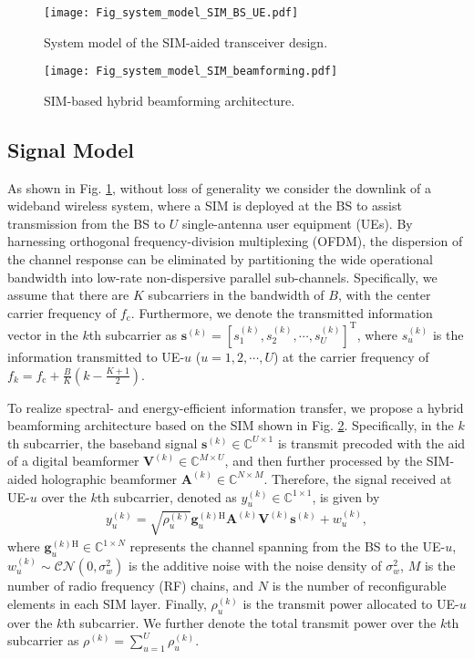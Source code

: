 \documentclass[lettersize,journal]{IEEEtran}
\theoremstyle{remark}
\begin{document}
\begin{figure}[!t]
    \centering
    \texttt{[image: Fig\_system\_model\_SIM\_BS\_UE.pdf]}
    \caption{System model of the SIM-aided transceiver design.}\label{Fig_system_model_SIM_BS_UE}
\end{figure}

\begin{figure}[!t]
    \centering
    \texttt{[image: Fig\_system\_model\_SIM\_beamforming.pdf]}
    \caption{SIM-based hybrid beamforming architecture.}\label{Fig_system_model_SIM_beamforming}
\end{figure}

\subsection{Signal Model}
As shown in Fig. \ref{Fig_system_model_SIM_BS_UE}, without loss of generality we consider the downlink of a wideband wireless system, where a SIM is deployed at the BS to assist transmission from the BS to $U$ single-antenna user equipment (UEs). By harnessing orthogonal frequency-division multiplexing (OFDM), the dispersion of the channel response can be eliminated by partitioning the wide operational bandwidth into low-rate non-dispersive parallel sub-channels. Specifically, we assume that there are $K$ subcarriers in the bandwidth of $B$, with the center carrier frequency of $f_\mathrm{c}$. Furthermore, we denote the transmitted information vector in the $k$th subcarrier as $\mathbf{s}^{(k)}=[s_1^{(k)},s_2^{(k)},\cdots,s_U^{(k)}]^\mathrm{T}$, where $s_u^{(k)}$ is the information transmitted to UE-$u$ ($u=1,2,\cdots,U$) at the carrier frequency of $f_k=f_\mathrm{c}+\frac{B}{K}(k-\frac{K+1}{2})$.

To realize spectral- and energy-efficient information transfer, we propose a hybrid beamforming architecture based on the SIM shown in Fig. \ref{Fig_system_model_SIM_beamforming}. Specifically, in the $k$th subcarrier, the baseband signal $\mathbf{s}^{(k)}\in\mathbb{C}^{U\times1}$ is transmit precoded with the aid of a digital beamformer $\mathbf{V}^{(k)}\in\mathbb{C}^{M\times U}$, and then further processed by the SIM-aided holographic beamformer $\mathbf{A}^{(k)}\in\mathbb{C}^{N\times M}$. Therefore, the signal received at UE-$u$ over the $k$th subcarrier, denoted as $y_u^{(k)}\in\mathbb{C}^{1\times1}$, is given by
\begin{align}\label{Signal_Model_1}
    y_u^{(k)}=\sqrt{\rho_u^{(k)}}\mathbf{g}_u^{(k)\mathrm{H}}\mathbf{A}^{(k)}
    \mathbf{V}^{(k)}\mathbf{s}^{(k)}+w_u^{(k)},
\end{align}
where $\mathbf{g}_u^{(k)\mathrm{H}}\in\mathbb{C}^{1\times N}$ represents the channel spanning from the BS to the UE-$u$, $w_u^{(k)}\sim\mathcal{CN}(0,\sigma_w^2)$ is the additive noise with the noise density of $\sigma_w^2$, $M$ is the number of radio frequency (RF) chains, and $N$ is the number of reconfigurable elements in each SIM layer. Finally, $\rho_u^{(k)}$ is the transmit power allocated to UE-$u$ over the $k$th subcarrier. We further denote the total transmit power over the $k$th subcarrier as $\rho^{(k)}=\sum_{u=1}^{U}\rho_u^{(k)}$.
\end{document}
